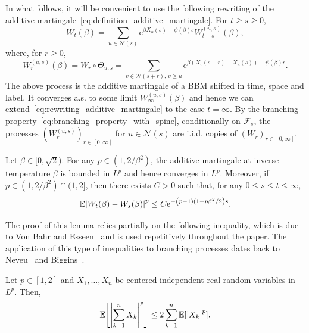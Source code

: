 \documentclass[AHL,Unicode,longabstracts,published]{cedram}
\newcommand{\e}{\mathrm{e}}
\newcommand{\E}{\mathbb{E}}
\newcommand\1{\mathds{1}}
\newcommand{\cF}{\mathcal{F}}
\newcommand{\cN}{\mathcal{N}}
\newcommand{\Expec}[1]{\mathbb{E}\left[#1\right]}
\newcommand{\abs}[1]{\left\lvert#1\right\rvert}
\let\originalleft\left
\let\originalright\right
\renewcommand{\left}{\mathopen{}\mathclose\bgroup\originalleft}
\renewcommand{\right}{\aftergroup\egroup\originalright}
\begin{document}
In what follows, it will be convenient to use the following rewriting of the additive martingale~\eqref{eq:definition_additive_martingale}. For $t \geq s \geq 0$,
\begin{equation}\label{eq:rewriting_additive_martingale}
W_t(\beta) = \sum_{u \in \cN(s)} \e^{\beta X_u(s) - \psi(\beta)s} W_{t - s}^{(u, s)}(\beta),
\end{equation}
where, for $r \geq 0$,
\begin{equation*}
W_r^{(u, s)}(\beta) = W_r \circ \Theta_{u, s} = \sum_{v \in \cN(s + r),\, v \geq u} \e^{\beta (X_v(s + r) - X_u(s)) - \psi(\beta)r}.
\end{equation*}
The above process is the additive martingale of a BBM shifted in time, space and label. It converges a.s. to some limit $W_\infty^{(u, s)}(\beta)$ and hence we can extend~\eqref{eq:rewriting_additive_martingale} to the case $t = \infty$. By the branching property~\eqref{eq:branching_property_with_spine}, conditionally on $\cF_s$, the processes $(W_r^{(u, s)})_{r \in[0, \infty]}$ for $u \in \cN(s)$ are i.i.d. copies of $(W_r)_{r \in [0, \infty]}$.

\begin{lemm}\label{lem:additive_martingale_convergence_in_Lp}
Let $\beta \in [0, \sqrt{2})$. For any $p \in (1, 2/\beta^2)$, the additive martingale at inverse temperature $\beta$ is bounded in $L^p$ and hence converges in $L^p$. Moreover, if $p \in (1, 2/\beta^2) \cap (1, 2]$, then there exists $C>0$ such that, for any $0 \leq s \leq t \leq \infty$,
\begin{equation*}
\E \left| W_t(\beta) - W_s(\beta) \right|^p \leq C \e^{-\left(p - 1)(1 - p\beta^2/2\right)s}.
\end{equation*}
\end{lemm}

The proof of this lemma relies partially on the following inequality, which is due to Von Bahr and Esseen~\cite[Theorem~2]{VonBahrEsseen1965} and is used repetitively throughout the paper. The application of this type of inequalities to branching processes dates back to Neveu~\cite{Neveu1988} and Biggins~\cite{Biggins1992}.

\begin{lemm}\label{lem:von_Bahr}
Let $p \in [1,2]$ and $X_1,\dots,X_n$ be centered independent real random variables in $L^p$. Then,
\[
\Expec{\abs{\sum_{k=1}^n X_k}^p}
\leq 2 \sum_{k=1}^n \Expec{\abs{X_k}^p}.
\]
\end{lemm}
\end{document}
